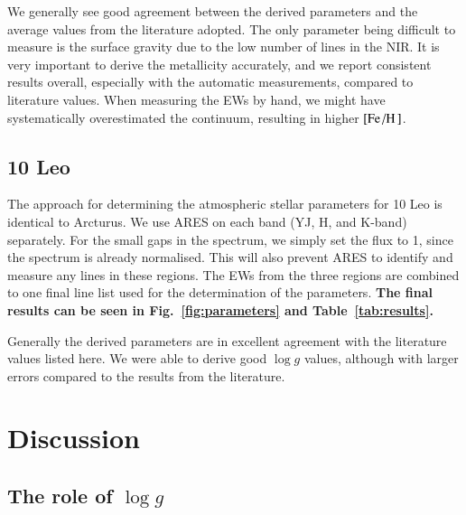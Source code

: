\documentclass{aa}
\begin{document}
We generally see good agreement between the derived parameters and the average
values from the literature adopted. The only parameter being difficult to
measure is the surface gravity due to the low number of  lines in
the NIR. It is very important to derive the metallicity accurately, and we
report consistent results overall, especially with the automatic measurements,
compared to literature values. When measuring the EWs by hand, we might have
systematically overestimated the continuum, resulting in higher
$[\ion{Fe}/\ion{H}]$.


\subsection{10 Leo}
\label{sec:10Leo}

The approach for determining the atmospheric stellar parameters for 10 Leo is
identical to Arcturus. We use ARES on each band (YJ, H, and K-band) separately.
For the small gaps in the spectrum, we simply set the flux to 1, since the
spectrum is already normalised. This will also prevent ARES to identify and
measure any lines in these regions. The EWs from the three regions are combined
to one final line list used for the determination of the parameters. {\bf The
final results can be seen in Fig.~\ref{fig:parameters} and
Table~\ref{tab:results}.}

Generally the derived parameters are in excellent agreement with the literature
values listed here. We were able to derive good $\log g$ values, although with
larger errors compared to the results from the literature. {}



\section{Discussion}
\label{sec:discussion}

\subsection{The role of $\log g$}
\end{document}
